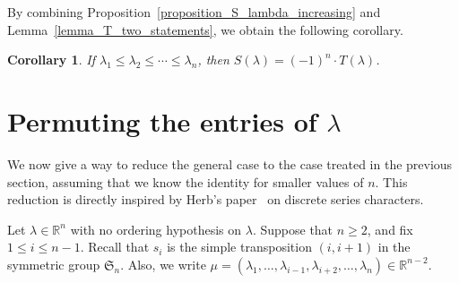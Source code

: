 \documentclass[10pt]{amsart}
\newtheorem{coro}[theorem]{Corollary}
\theoremstyle{definition}
\newcommand{\Rrr}{\mathbb{R}}
\newcommand{\Sym}{\mathfrak{S}}
\newcommand{\R}{\Rrr}
\begin{document}
By combining
Proposition~\ref{proposition_S_lambda_increasing}
and
Lemma~\ref{lemma_T_two_statements},
we obtain the following corollary.
\begin{coro} 
If $\lambda_{1} \leq \lambda_{2} \leq \cdots \leq \lambda_{n}$, then
$S(\lambda)=(-1)^{n} \cdot  T(\lambda)$.
\label{corollary_base_case}
\end{coro}







\section{Permuting the entries of \texorpdfstring{$\lambda$}{lambda}}
\label{section_permute}

We now give a way to reduce the general case to the case treated
in the previous section,
assuming that we know the identity for smaller values of $n$.
This reduction is
directly inspired by Herb's paper~\cite{Herb} 
on discrete series characters. 

Let $\lambda \in \Rrr^{n}$
with no ordering hypothesis on $\lambda$.
Suppose that $n \geq 2$, and fix $1 \leq i \leq n-1$.
Recall that $s_{i}$ is the simple transposition $(i,i+1)$
in the symmetric group $\Sym_{n}$.
Also, we write
$\mu=(\lambda_{1},\ldots,\lambda_{i-1},\lambda_{i+2},\ldots,\lambda_{n})\in\R^{n-2}$.
\end{document}
